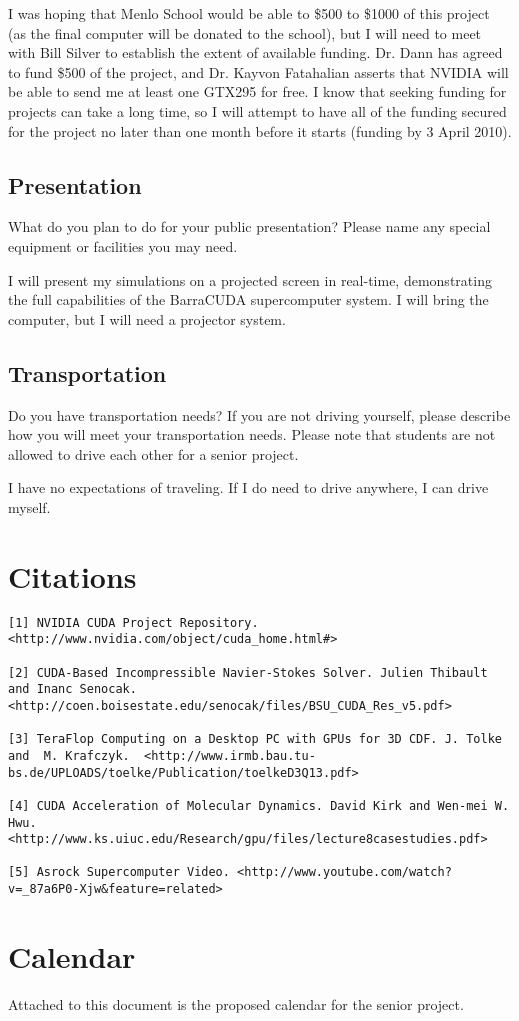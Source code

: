 \documentclass[10pt]{article}
\begin{document}
I was hoping that Menlo School would be able to \$500 to \$1000 of this project (as the final computer will be donated to the school), but I will need to meet with Bill Silver to establish the extent of available funding. Dr. Dann has agreed to fund \$500 of the project, and Dr. Kayvon Fatahalian asserts that NVIDIA will be able to send me at least one GTX295 for free. I know that seeking funding for projects can take a long time, so I will attempt to have all of the funding secured for the project no later than one month before it starts (funding by 3 April 2010).

\subsection{Presentation}
What do you plan to do for your public presentation? Please name any special equipment or facilities you may need.

I will present my simulations on a projected screen in real-time, demonstrating the full capabilities of the BarraCUDA supercomputer system. I will bring the computer, but I will need a projector system.

\subsection{Transportation}
Do you have transportation needs? If you are not driving yourself, please describe how you will meet your transportation needs. Please note that students are not allowed to drive each other for a senior project.

I have no expectations of traveling. If I do need to drive anywhere, I can drive myself.

\section{Citations}
\begin{verbatim}
[1] NVIDIA CUDA Project Repository. <http://www.nvidia.com/object/cuda_home.html#>

[2] CUDA-Based Incompressible Navier-Stokes Solver. Julien Thibault and Inanc Senocak.  <http://coen.boisestate.edu/senocak/files/BSU_CUDA_Res_v5.pdf>

[3] TeraFlop Computing on a Desktop PC with GPUs for 3D CDF. J. Tolke and  M. Krafczyk.  <http://www.irmb.bau.tu-bs.de/UPLOADS/toelke/Publication/toelkeD3Q13.pdf>

[4] CUDA Acceleration of Molecular Dynamics. David Kirk and Wen-mei W. Hwu.  <http://www.ks.uiuc.edu/Research/gpu/files/lecture8casestudies.pdf>

[5] Asrock Supercomputer Video. <http://www.youtube.com/watch?v=_87a6P0-Xjw&feature=related>
\end{verbatim}

\section{Calendar}
Attached to this document is the proposed calendar for the senior project.
\end{document}

